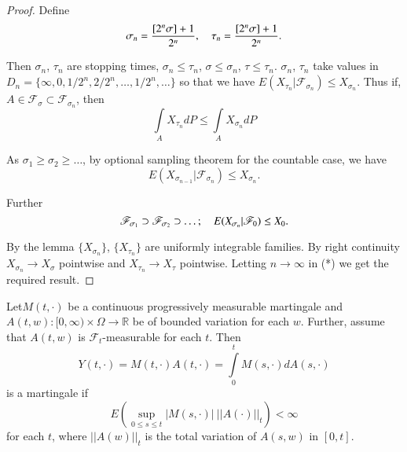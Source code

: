 \begin{proof}
Define
$$
\sigma_{n}=\frac{[2^{n}\sigma]+1}{2^{n}},\quad
\tau_{n}=\frac{[2^{n}\sigma]+1}{2^{n}}. 
$$

Then $\sigma_{n}$, $\tau_{n}$ are stopping times, $\sigma_{n}\leq
\tau_{n}$, $\sigma\leq \sigma_{n}$, $\tau\leq \tau_{n}$. $\sigma_{n}$,
$\tau_{n}$ take values in
$D_{n}=\{\infty,0,1/2^{n},2/2^{n},\ldots,1/2^{n},\ldots\}$ so that we
have $E(X_{\tau_{n}}|\mathscr{F}_{\sigma_{n}})\leq
X_{\sigma_{n}}$. Thus if, $A\in \mathscr{F}_{\sigma}\subset
\mathscr{F}_{\sigma_{n}}$, then 
\begin{equation*}
\int\limits_{A}X_{\tau_{n}}dP\leq \int\limits_{A}X_{\sigma_{n}}dP\tag{*}
\end{equation*}

As $\sigma_{1}\geq \sigma_{2}\geq \ldots$, by optional sampling
theorem for the countable case, we have
$$
E(X_{\sigma_{n-1}}|\mathscr{F}_{\sigma_{n}})\leq X_{\sigma_{n}}.
$$

Further
$$
\mathscr{F}_{\sigma_{1}}\supset \mathscr{F}_{\sigma_{2}}\supset
  \ldots;\quad E(X_{\sigma_{n}}|\mathscr{F}_{0})\leq X_{0}.
$$

By the lemma $\{X_{\sigma_{n}}\}$, $\{X_{\tau_{n}}\}$ are uniformly
integrable families. By right continuity $X_{\sigma_{n}}\to
X_{\sigma}$ pointwise and $X_{\tau_{n}}\to X_{\tau}$
pointwise. Letting $n\to \infty$ in (*) we get the required result.
\end{proof}

\begin{lemma*} 
Let\pageoriginale $M(t,\cdot)$ be a continuous progressively
  measurable martingale and $A(t,w):[0,\infty)\times \Omega\to
    \mathbb{R}$ be of bounded variation for each $w$. Further, assume
    that $A(t,w)$ is $\mathscr{F}_{t}$-measu\-rable for each $t$. Then
$$
Y(t,\cdot)=M(t,\cdot)A(t,\cdot)=\int\limits^{t}_{0}M(s,\cdot)dA(s,\cdot)
$$
is a martingale if
$$
E(\sup\limits_{0\leq s\leq t}|M(s,\cdot)|~||A(\cdot)||_{t})<\infty
$$
for each $t$, where $||A(w)||_{t}$ is the total variation of $A(s,w)$
in $[0,t]$.
\end{lemma*}

